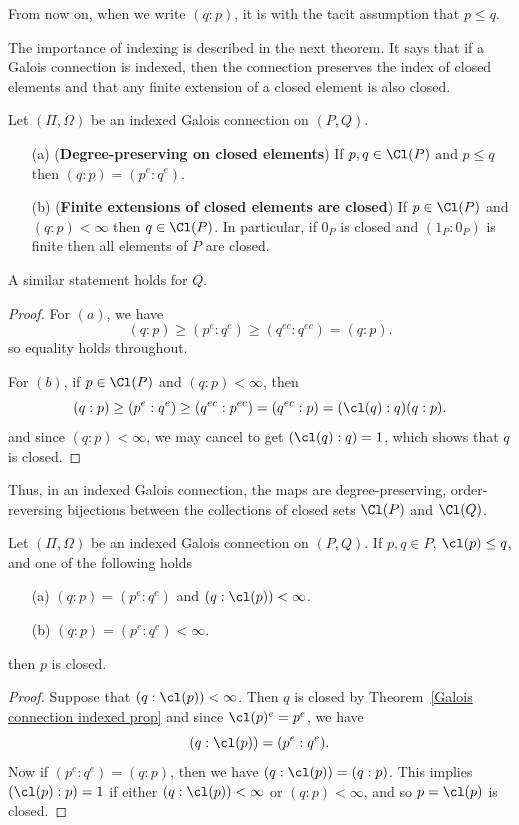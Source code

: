 From now on, when we write $(q:p)$, it is with the tacit assumption that $p\leq q$.\par
The importance of indexing is described in the next theorem. It says that if a Galois connection is indexed, then the connection preserves the index of closed elements and that any finite extension of a closed element is also closed.
\begin{theorem}\label{Galois connection indexed prop}
Let $(\Pi,\Omega)$ be an indexed Galois connection on $(P,Q)$.
\begin{itemize}
\item[(a)] (\textbf{Degree-preserving on closed elements}) If $p,q\in\Cl(P)$ and $p\leq q$ then $(q:p)=(p^e:q^e)$.
\item[(b)] (\textbf{Finite extensions of closed elements are closed}) If $p\in\Cl(P)$ and $(q:p)<\infty$ then $q\in\Cl(P)$. In particular, if $0_P$ is closed and $(1_P:0_P)$ is finite then all elements of $P$ are closed.
\end{itemize}
A similar statement holds for $Q$.
\end{theorem}
\begin{proof}
For $(a)$, we have
\[(q:p)\geq(p^e:q^e)\geq(q^{ec}:q^{ec})=(q:p).\]
so equality holds throughout.\par
For $(b)$, if $p\in\Cl(P)$ and $(q:p)<\infty$, then
\[(q:p)\geq(p^e:q^e)\geq(q^{ec}:p^{ec})=(q^{ec}:p)=(\cl(q):q)(q:p).\]
and since $(q:p)<\infty$, we may cancel to get $(\cl(q):q)=1$, which shows that $q$ is closed.
\end{proof}
Thus, in an indexed Galois connection, the maps are degree-preserving, order-reversing bijections between the collections of closed sets $\Cl(P)$ and $\Cl(Q)$.\par
\begin{proposition}\label{Galois connection degree argument}
Let $(\Pi,\Omega)$ be an indexed Galois connection on $(P,Q)$. If $p,q\in P$, $\cl(p)\leq q$, and one of the following holds
\begin{itemize}
\item[(a)] $(q:p)=(p^e:q^e)$ and $(q:\cl(p))<\infty$.
\item[(b)] $(q:p)=(p^e:q^e)<\infty$.
\end{itemize}
then $p$ is closed.
\end{proposition}
\begin{proof}
Suppose that $(q:\cl(p))<\infty$. Then $q$ is closed by Theorem~\ref{Galois connection indexed prop} and since $\cl(p)^e=p^e$, we have
\[(q:\cl(p))=(p^e:q^e).\]
Now if $(p^e:q^e)=(q:p)$, then we have $(q:\cl(p))=(q:p)$. This implies $(\cl(p):p)=1$ if either $(q:\cl(p))<\infty$ or $(q:p)<\infty$, and so $p=\cl(p)$ is closed.
\end{proof}
